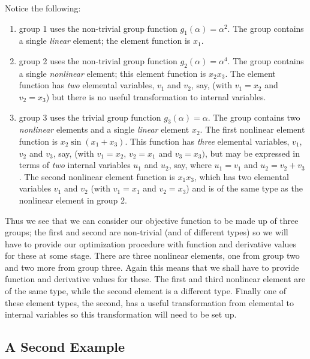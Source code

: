 \documentclass[a4paper]{article}
\begin{document}
Notice the following:
\begin{enumerate}
\item
group 1 uses the non-trivial group
function $g_1 (\alpha)  = \alpha^
2$.  The group  contains a  single {\em linear}  element;  the element
function is $x_1$.

\item
group 2 uses   the   non-trivial group  function
$g_2(\alpha)  =
\alpha^4$.  The group contains  a single {\em nonlinear} element; this
element function is  $x_2 x_3$.   The element  function has  {\em two}
elemental variables,
$v_1$ and $v_2$, say,  (with $v_1 = x_2$ and $v_2
= x_3$) but there is no useful transformation to internal variables.

\item
group 3 uses the trivial group function
$g_3 (\alpha) = \alpha$.  The
group contains two {\em nonlinear} elements and a  single {\em linear}
element $x_2$.  The first nonlinear element function is $x_2 \sin ( x_1
+ x_3 )$.  This  function has {\em  three} elemental variables, $v_1$,
$v_2$ and $v_3$,  say, (with $v_1 =  x_2 $, $v_2 =  x_1$  and  $v_3  =
x_3)$, but may be expressed in terms of {\em two} internal variables
$u_1$ and $u_2$, say,  where $u_1 = v_1 $  and $u_2= v_2  + v_3$.  The
second nonlinear element  function is $x_1  x_3$,  which has two
elemental variables $v_1$ and $v_2$ (with $v_1 = x_1$ and $v_2 =  x_3$)
and is  of the same type as the nonlinear element in group 2.
\end{enumerate}

Thus we see that we can consider our objective  function
to be  made up of three  groups;
the first and  second are non-trivial
(and  of different types) so we  will have to provide our optimization
procedure with function and derivative
values  for these at  some stage.  There
are  three nonlinear elements,
one from group two and  two more from  group three.
Again  this means
that  we   shall have to provide  function   and derivative
values for
these.  The first and  third nonlinear  element
are of  the same type,
while the  second  element is a  different type.  Finally one of these
element types, the second, has  a useful transformation from elemental
to internal variables so this transformation will need to be set up.

\subsection{\label{S1.5}A Second Example}
\end{document}
